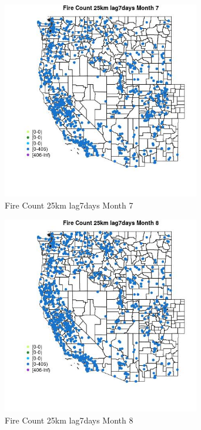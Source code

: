 \begin{figure} 
\centering  
\includegraphics[width=0.77\textwidth]{Code_Outputs/Report_ML_input_PM25_Step4_part_f_de_duplicated_aveswNAs_MapObsMo7Fire_Count_25km_lag7days.jpg} 
\caption{\label{fig:Report_ML_input_PM25_Step4_part_f_de_duplicated_aveswNAsMapObsMo7Fire_Count_25km_lag7days}Fire Count 25km lag7days Month 7} 
\end{figure} 
 

\begin{figure} 
\centering  
\includegraphics[width=0.77\textwidth]{Code_Outputs/Report_ML_input_PM25_Step4_part_f_de_duplicated_aveswNAs_MapObsMo8Fire_Count_25km_lag7days.jpg} 
\caption{\label{fig:Report_ML_input_PM25_Step4_part_f_de_duplicated_aveswNAsMapObsMo8Fire_Count_25km_lag7days}Fire Count 25km lag7days Month 8} 
\end{figure} 
 

